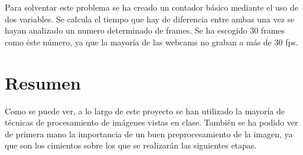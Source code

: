 \documentclass{article}
\begin{document}
Para solventar este problema se ha creado un contador básico mediante el uso de dos variables. Se calcula el tiempo que hay de diferencia entre ambas una vez se hayan analizado un numero determinado de frames. Se ha escogido 30 frames como éste número, ya que la mayoría de las webcams no graban a más de 30 fps.
  
\section{Resumen}

Como se puede ver, a lo largo de este proyecto se han utilizado la mayoría de técnicas de procesamiento de imágenes vistas en clase.
También se ha podido ver de primera mano la importancia de un buen preprocesamiento de la imagen, ya que son los cimientos sobre los que se realizarán las siguientes etapas.
\end{document}
